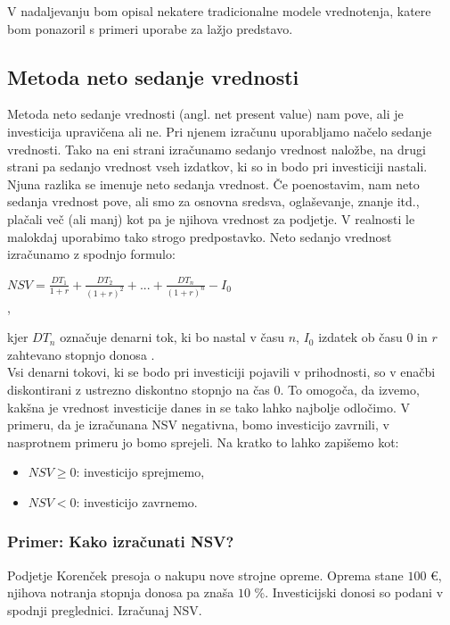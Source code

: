 \documentclass[12pt, a4paper]{amsart}
\theoremstyle{definition} %
\theoremstyle{plain} %
\begin{document}
V nadaljevanju  bom opisal nekatere tradicionalne modele vrednotenja, katere bom ponazoril s primeri uporabe za lažjo predstavo.

\subsection{Metoda neto sedanje vrednosti}
Metoda neto sedanje vrednosti (angl. net present value) nam pove, ali je investicija upravičena ali ne. Pri njenem izračunu uporabljamo načelo sedanje vrednosti. Tako na eni strani izračunamo sedanjo vrednost naložbe, na drugi strani pa sedanjo vrednost vseh izdatkov, ki so in bodo pri investiciji nastali. Njuna razlika se imenuje neto sedanja vrednost. Če poenostavim, nam neto sedanja vrednost pove, ali smo za osnovna sredsva, oglaševanje, znanje itd., plačali več (ali manj) kot pa je njihova vrednost za podjetje. V realnosti le malokdaj uporabimo tako strogo predpostavko. Neto sedanjo vrednost izračunamo z spodnjo formulo: \\

\begin{center}
$  NSV = \tfrac{DT_1}{1+r} + \tfrac{DT_2}{(1+r)^2} + ... + \tfrac{DT_n}{(1+r)^n} - I_0 $ \\,
\end{center}

kjer $DT_n$ označuje denarni tok, ki bo nastal v času $n$, $I_0$ izdatek ob času 0 in $r$ zahtevano stopnjo donosa \cite[str. 154]{Mramor}. \\

Vsi denarni tokovi, ki se bodo pri investiciji pojavili v prihodnosti, so v enačbi diskontirani z ustrezno diskontno stopnjo na čas 0. To omogoča, da izvemo, kakšna je vrednost investicije danes in se tako lahko najbolje  odločimo. V primeru, da je izračunana NSV negativna, bomo investicijo zavrnili, v nasprotnem primeru jo bomo sprejeli. Na kratko to lahko zapišemo kot:

\begin{itemize}
\item $NSV \geq 0$: investicijo sprejmemo,
\item $NSV<0$: investicijo zavrnemo.
\end{itemize}

\subsubsection{Primer: Kako izračunati NSV?}
Podjetje Korenček presoja o nakupu nove strojne opreme. Oprema stane $100$ €, njihova notranja stopnja donosa pa znaša $10$ \%. Investicijski donosi so podani v spodnji preglednici. Izračunaj NSV. \\
\end{document}
